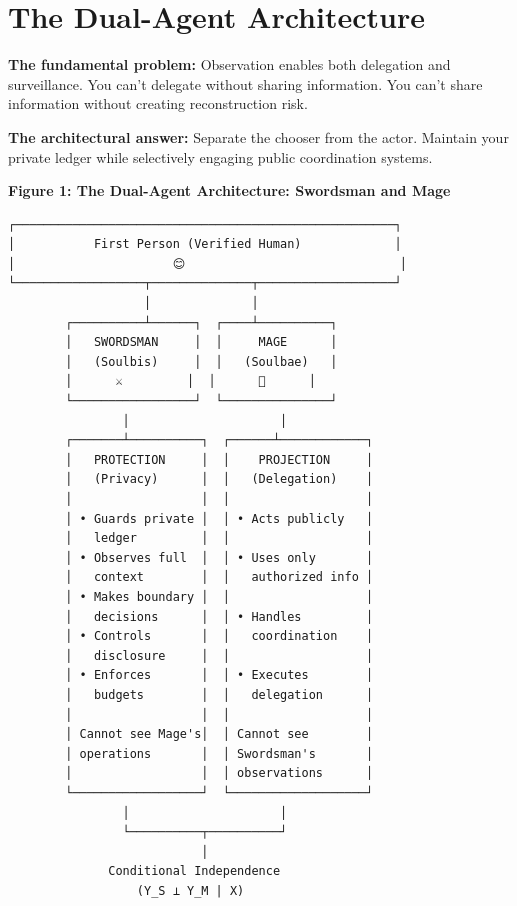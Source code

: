 \documentclass[11pt,a4paper]{article}
\theoremstyle{definition}
\begin{document}
\section{The Dual-Agent Architecture}

\textbf{The fundamental problem:} Observation enables both delegation and surveillance. You can't delegate without sharing information. You can't share information without creating reconstruction risk.

\textbf{The architectural answer:} Separate the chooser from the actor. Maintain your private ledger while selectively engaging public coordination systems.

\textbf{Figure 1: The Dual-Agent Architecture: Swordsman and Mage}

\begin{verbatim}
┌─────────────────────────────────────────────────────┐
│           First Person (Verified Human)             │
│                      😊                              │
└──────────────────┬──────────────┬───────────────────┘
                   │              │
        ┌──────────┴──────┐  ┌────┴──────────┐
        │   SWORDSMAN     │  │     MAGE      │
        │   (Soulbis)     │  │   (Soulbae)   │
        │      ⚔️         │  │      🧙      │
        └─────────────────┘  └───────────────┘
                │                     │
        ┌───────┴──────────┐  ┌──────┴────────────┐
        │   PROTECTION     │  │    PROJECTION     │
        │   (Privacy)      │  │   (Delegation)    │
        │                  │  │                   │
        │ • Guards private │  │ • Acts publicly   │
        │   ledger         │  │                   │
        │ • Observes full  │  │ • Uses only       │
        │   context        │  │   authorized info │
        │ • Makes boundary │  │                   │
        │   decisions      │  │ • Handles         │
        │ • Controls       │  │   coordination    │
        │   disclosure     │  │                   │
        │ • Enforces       │  │ • Executes        │
        │   budgets        │  │   delegation      │
        │                  │  │                   │
        │ Cannot see Mage's│  │ Cannot see        │
        │ operations       │  │ Swordsman's       │
        │                  │  │ observations      │
        └──────────────────┘  └───────────────────┘
                │                     │
                └──────────┬──────────┘
                           │
              Conditional Independence
                  (Y_S ⊥ Y_M | X)
\end{verbatim}
\end{document}
